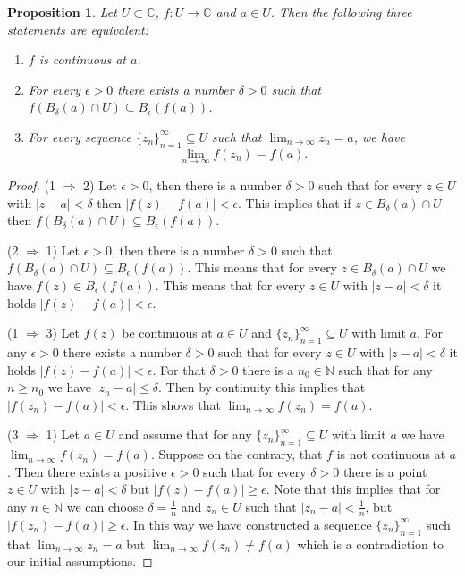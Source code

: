 \documentclass{amsart}
\newtheorem{prop}{Proposition}
\begin{document}
\begin{prop}
Let \(U \subset \mathbb{C}\), \(f: U \to \mathbb{C}\) and \(a\in U\). Then the following three statements are equivalent:
\begin{enumerate}
\item \(f\) is continuous at \(a\).
\item For every \(\epsilon >0\) there exists a number  \(\delta >0\) such that \(f\left( B_{\delta}(a) \cap U\right) \subseteq B_{\epsilon}(f(a))\).
\item For every sequence \(\{z_n\}_{n=1}^{\infty}\subseteq U\) such that \(\displaystyle\lim_{n\to \infty} z_n = a\), we have \[\displaystyle\lim_{n\to \infty} f(z_n) = f(a).\]
\end{enumerate}
\end{prop}
\begin{proof}
(1 \(\Rightarrow\) 2) Let \(\epsilon >0\), then there is a number \(\delta >0\)  such that for every \(z\in U\) with \(|z-a| < \delta\) then \(|f(z) - f(a)| < \epsilon\). This implies that if \(z\in B_{\delta}(a) \cap U\)  then \(f(B_{\delta}(a) \cap U)\subseteq B_{\epsilon}(f(a))\).

(2 \(\Rightarrow\) 1) Let \(\epsilon >0\), then there is a number \(\delta >0\)  such that  \(f(B_{\delta}(a) \cap U)\subseteq B_{\epsilon}(f(a))\). This means that for every  \(z\in B_{\delta}(a) \cap U\) we have \(f(z)\in B_{\epsilon} (f(a))\). This means that for every  \(z\in U\) with  \(|z-a| < \delta\) it holds \(|f(z) - f(a)| < \epsilon\). 

(1 \(\Rightarrow\) 3) Let \(f(z)\) be continuous at \(a\in U\) and \(\{z_n\}_{n=1}^{\infty}\subseteq U\) with limit \(a\). For any \(\epsilon >0\) there exists a number \(\delta >0\) such that for every \(z\in U\) with \(|z-a|<\delta\) it holds \(|f(z)-f(a)|  < \epsilon\). For that \(\delta >0\) there is a \(n_0\in \mathbb{N}\) such that for any \(n\geq n_0\) we have \(|z_n - a| \leq \delta\). Then by continuity this implies that \(|f(z_n) - f(a) | < \epsilon\). This shows that \(\lim_{n\to \infty} f(z_n) = f(a)\).

(3 \(\Rightarrow\) 1) Let \(a\in U\) and assume that for any \(\{z_n\}_{n=1}^{\infty}\subseteq U\) with limit \(a\) we have \(\lim_{n\to \infty} f(z_n) = f(a)\). Suppose on the contrary, that \(f\) is not continuous at \(a\). Then there exists a positive \(\epsilon >0\) such that for every \(\delta >0\) there is a point \(z\in U\) with \(|z -a| < \delta\) but \(|f(z) - f(a)| \geq \epsilon\). Note that this implies that for any \(n\in\mathbb{N}\) we can choose \(\delta = \frac{1}{n}\) and  \(z_n\in U\) such that \(|z_n - a| < \frac{1}{n}\), but  \(|f(z_n) - f(a)| \geq \epsilon\). In this way we have constructed a sequence \(\{z_n\}_{n=1}^{\infty}\) such that \(\lim_{n\to\infty}z_n = a\) but \(\lim_{n\to\infty}f(z_n) \neq f(a)\) which is a contradiction to our initial assumptions.


\end{proof}
\end{document}
